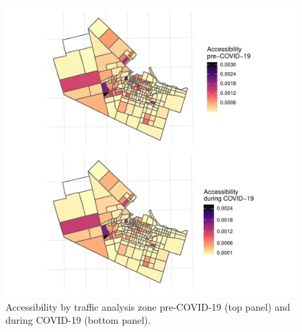 \documentclass[]{elsarticle} %
\providecommand{\DIFaddbeginFL}{} %
\providecommand{\DIFaddendFL}{} %
\providecommand{\DIFdelbeginFL}{} %
\providecommand{\DIFdelendFL}{} %
\newcommand{\DIFscaledelfig}{0.5}
\newlength{\DIFdelgraphicswidth} %
\newlength{\DIFdelgraphicsheight} %
\newcommand{\DIFaddincludegraphics}[2][]{{\color{blue}\fbox{\DIFOincludegraphics[#1]{#2}}}} %
\newcommand{\DIFdelincludegraphics}[2][]{%
\sbox{\DIFdelgraphicsbox}{\DIFOincludegraphics[#1]{#2}}%
\settoboxwidth{\DIFdelgraphicswidth}{\DIFdelgraphicsbox} %
\settoboxtotalheight{\DIFdelgraphicsheight}{\DIFdelgraphicsbox} %
\scalebox{\DIFscaledelfig}{%
\parbox[b]{\DIFdelgraphicswidth}{\usebox{\DIFdelgraphicsbox}\\[-\baselineskip] \rule{\DIFdelgraphicswidth}{0em}}\llap{\resizebox{\DIFdelgraphicswidth}{\DIFdelgraphicsheight}{%
\setlength{\unitlength}{\DIFdelgraphicswidth}%
\begin{picture}(1,1)%
\thicklines\linethickness{2pt} %
{\color[rgb]{1,0,0}\put(0,0){\framebox(1,1){}}}%
{\color[rgb]{1,0,0}\put(0,0){\line( 1,1){1}}}%
{\color[rgb]{1,0,0}\put(0,1){\line(1,-1){1}}}%
\end{picture}%
}\hspace*{3pt}}} %
} %
\DeclareRobustCommand{\DIFaddbeginFL}{\DIFOaddbeginFL \let\includegraphics\DIFaddincludegraphics} %
\DeclareRobustCommand{\DIFaddendFL}{\DIFOaddendFL \let\includegraphics\DIFOincludegraphics} %
\DeclareRobustCommand{\DIFdelbeginFL}{\DIFOdelbeginFL \let\includegraphics\DIFdelincludegraphics} %
\DeclareRobustCommand{\DIFdelendFL}{\DIFOaddendFL \let\includegraphics\DIFOincludegraphics} %
\begin{document}
\begin{figure}

{\centering \DIFdelbeginFL %
\DIFdelendFL \DIFaddbeginFL \includegraphics[width=1\linewidth]{Accessibility-Foodbanks-Hamilton_files/figure-latex/plot-accessibility-1} 
\DIFaddendFL 

}

\caption{\label{fig:accessibility}Accessibility by traffic analysis zone pre-COVID-19 (top panel) and during COVID-19 (bottom panel).}\label{fig:plot-accessibility}
\end{figure}
\end{document}

